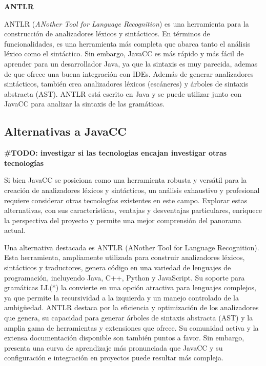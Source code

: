 \phantom{text}

\noindent \textbf{ANTLR}

\phantom{text}

\noindent ANTLR (\textit{ANother Tool for Language Recognition}) es una herramienta para la construcción de analizadores léxicos y sintácticos. En términos de funcionalidades, es una herramienta más completa que abarca tanto el análisis léxico como el sintáctico. Sin embargo, JavaCC es más rápido y más fácil de aprender para un desarrollador Java, ya que la sintaxis es muy parecida, ademas de que ofrece una buena integración con IDEs\cite{antlr}. Además de generar analizadores sintácticos, también crea analizadores léxicos (escáneres) y árboles de sintaxis abstracta (AST).
ANTLR está escrito en Java y se puede utilizar junto con JavaCC para analizar la sintaxis de las gramáticas.

\subsection{Alternativas a JavaCC}

\textbf{\#TODO: investigar si las tecnologias encajan %
investigar otras tecnologías
}

\noindent Si bien JavaCC se posiciona como una herramienta robusta y versátil para la creación de analizadores léxicos y sintácticos, un análisis exhaustivo y profesional requiere considerar otras tecnologías existentes en este campo. Explorar estas alternativas, con sus características, ventajas y desventajas particulares, enriquece la perspectiva del proyecto y permite una mejor comprensión del panorama actual.

Una alternativa destacada es ANTLR (ANother Tool for Language Recognition). Esta herramienta, ampliamente utilizada para construir analizadores léxicos, sintácticos y traductores, genera código en una variedad de lenguajes de programación, incluyendo Java, C++, Python y JavaScript. Su soporte para gramáticas LL(*) la convierte en una opción atractiva para lenguajes complejos, ya que permite la recursividad a la izquierda y un manejo controlado de la ambigüedad. ANTLR destaca por la eficiencia y optimización de los analizadores que genera, su capacidad para generar árboles de sintaxis abstracta (AST) y la amplia gama de herramientas y extensiones que ofrece. Su comunidad activa y la extensa documentación disponible son también puntos a favor. Sin embargo, presenta una curva de aprendizaje más pronunciada que JavaCC y su configuración e integración en proyectos puede resultar más compleja.

